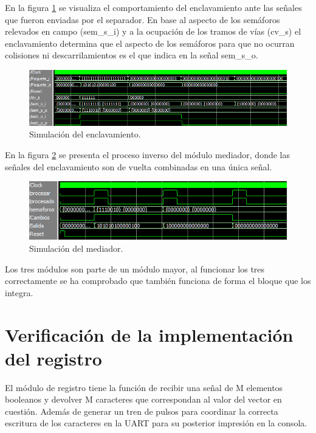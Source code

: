 		En la figura \ref{fig:Test_Enclavamiento} se visualiza el comportamiento del enclavamiento ante las señales que fueron enviadas por el separador. En base al aspecto de los semáforos relevados en campo (sem\_s\_i) y a la ocupación de los tramos de vías (cv\_s) el enclavamiento determina que el aspecto de los semáforos para que no ocurran colisiones ni descarrilamientos es el que indica en la señal sem\_s\_o.
		
		\begin{figure}[!hbt]
		\centering
		\includegraphics[scale=0.7]{./Figures/Test/Enclavamiento}
			\caption{Simulación del enclavamiento.}
			\label{fig:Test_Enclavamiento}
		\end{figure}

		\vspace{5cm}
		
		En la figura \ref{fig:Test_Mediador} se presenta el proceso inverso del módulo mediador, donde las señales del enclavamiento son de vuelta combinadas en una única señal.
		
		\begin{figure}[!hbt]
		\centering
		\includegraphics[scale=0.9]{./Figures/Test/Mediador}
			\caption{Simulación del mediador.}
			\label{fig:Test_Mediador}
		\end{figure}
		
		Los tres módulos son parte de un módulo mayor, al funcionar los tres correctamente se ha comprobado que también funciona de forma el bloque que los integra.
		
\section{Verificación de la implementación del registro}

	El módulo de registro tiene la función de recibir una señal de M elementos booleanos y devolver M caracteres que correspondan al valor del vector en cuestión. Además de generar un tren de pulsos para coordinar la correcta escritura de los caracteres en la UART para su posterior impresión en la consola.
	
